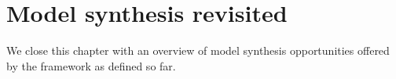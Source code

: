 \section{Model synthesis revisited\label{section:background-discussion}}

We close this chapter with an overview of model synthesis opportunities offered by the framework as defined so far. 
